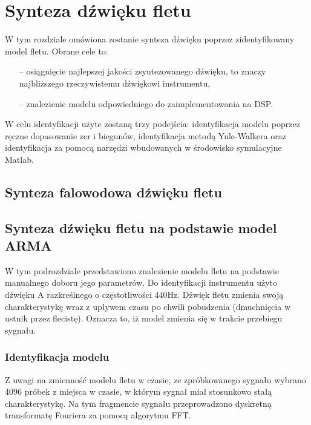 \section{Synteza dźwięku fletu}

W tym rozdziale omówiona zostanie synteza dźwięku poprzez zidentyfikowany model fletu. Obrane cele to:
\begin{enumerate}
	\setlength\itemsep{-3pt}
	\item[--] osiągnięcie najlepszej jakości zsyntezowanego dźwięku, to znaczy najbliższego rzeczywistemu dźwiękowi instrumentu,
	\item[--] znalezienie modelu odpowiedniego do zaimplementowania na DSP.
\end{enumerate}


W celu identyfikacji użyte zostaną trzy podejścia: identyfikacja modelu poprzez ręczne dopasowanie zer i biegunów, identyfikacja metodą Yule-Walkera oraz identyfikacja za pomocą narzędzi wbudowanych w środowisko symulacyjne Matlab.

\subsection{Synteza falowodowa dźwięku fletu}

\subsection{Synteza dźwięku fletu na podstawie model ARMA}
W tym podrozdziale przedstawiono znalezienie modelu fletu na podstawie manualnego doboru jego parametrów. Do identyfikacji instrumentu użyto dźwięku A razkreślnego o częstotliwości 440Hz. Dźwięk fletu zmienia swoją charakterystykę wraz z upływem czasu po chwili pobudzenia (dmuchnięcia w ustnik przez flecistę). Oznacza to, iż model zmienia się w trakcie przebiegu sygnału.

\subsubsection{Identyfikacja modelu}
Z uwagi na zmienność modelu fletu w czasie, ze zpróbkowanego sygnału wybrano 4096 próbek z miejsca w czasie, w którym sygnał miał stosunkowo stałą charakterystykę. Na tym fragmencie sygnału przeprowadzono dyskretną transformatę Fouriera za pomocą algorytmu FFT.


